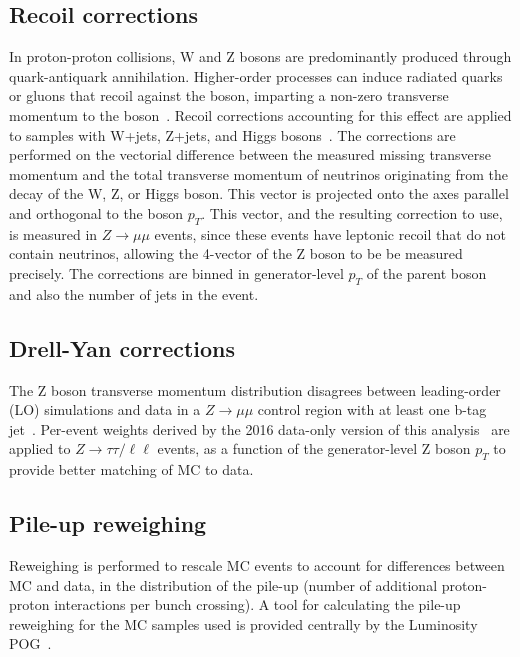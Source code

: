     

\subsection{Recoil corrections}
\label{sec:ch-8-recoil-corrections}
In proton-proton collisions, W and Z bosons are predominantly produced through quark-antiquark annihilation. Higher-order processes can induce radiated quarks or gluons that recoil against the boson, imparting a non-zero transverse momentum to the boson~\cite{2009-Tevatron-recoil-correction}. Recoil corrections accounting for this effect are applied to samples with W+jets, Z+jets, and Higgs bosons~\cite{twiki_HiggsToTauTauWorkingLegacyRun2}. The corrections are performed on the vectorial difference between the measured missing transverse momentum and the total transverse momentum of neutrinos originating from the decay of the W, Z, or Higgs boson. This vector is projected onto the axes parallel and orthogonal to the boson $p_{T}$. This vector, and the resulting correction to use, is measured in $Z \rightarrow \mu\mu$ events, since these events have leptonic recoil that do not contain neutrinos, allowing the 4-vector of the Z boson to be be measured precisely. The corrections are binned in generator-level $p_{T}$ of the parent boson and also the number of jets in the event.

\subsection{Drell-Yan corrections}
The Z boson transverse momentum distribution disagrees between leading-order (LO) simulations and data in a $Z \rightarrow \mu\mu$ control region with at least one b-tag jet~\cite{CMS-HIG-17-024}. Per-event weights derived by the 2016 data-only version of this analysis~\cite{CMS-HIG-17-024} are applied to $Z \rightarrow \tau\tau / \ell \ell$ events, as a function of the generator-level Z boson $p_{T}$ to provide better matching of MC to data.

\subsection{Pile-up reweighing}
Reweighing is performed to rescale MC events to account for differences between MC and data, in the distribution of the pile-up (number of additional proton-proton interactions per bunch crossing). A tool for calculating the pile-up reweighing for the MC samples used is provided centrally by the Luminosity POG~\cite{twiki_LUMI_POG_recommendation}.

